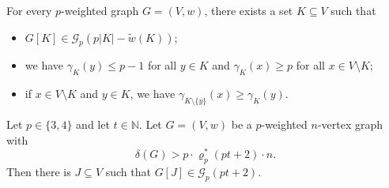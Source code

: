 \documentclass[10pt,a4paper]{amsart}
\newcommand{\cG}{\mathcal{G}}
\begin{document}
\begin{proposition}\label{prop-hero}
	For every $p$-weighted graph $G=(V,w)$, there exists a set $K \subseteq V$ such that
	\begin{itemize}
	\item[(i)] $G[K] \in \cG_p(p|K|-\tilde{w}(K))$;
	\item[(ii)] we have $\gamma_K(y) \leq p-1$ for all $y \in K$ and $\gamma_K(x) \geq p$ for all $x \in V\setminus K$;
	\item[(iii)] if $x \in V\setminus K$ and $y \in K$, we have $\gamma_{K\setminus\{y\}}(x) \geq \gamma_K(y)$.
	\end{itemize}
\end{proposition}

\begin{lemma}\label{smallp}
	Let $p \in\lbrace 3,4\rbrace$ and let $t\in\mathbb{N}$.
	Let $G=(V,w)$ be a $p$-weighted $n$-vertex graph with
	$$\delta(G)>p \cdot \varrho_p^*(pt+2) \cdot n.$$
	Then there is $J \subseteq V$ such that $G[J] \in \cG_p(pt+2)$.
\end{lemma}
\end{document}
